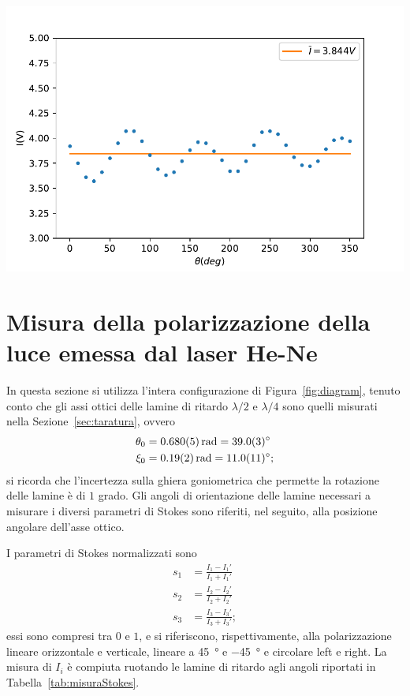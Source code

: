 \documentclass[10pt,oneside,a4paper]{article}
\newenvironment{Figure}
  {\par\medskip\noindent\minipage{\linewidth}}
  {\endminipage\par\medskip}
\begin{document}
\begin{multicols}{2}
\begin{Figure}
	\begin{center}
	\includegraphics[width=\linewidth]{align.pdf}
	\label{fig:align}
	\end{center}
\end{Figure}


\section{Misura della polarizzazione della luce emessa dal laser He-Ne}
In questa sezione si utilizza l'intera configurazione di Figura~\ref{fig:diagram}, tenuto conto che gli assi ottici delle lamine di ritardo $\lambda / 2$ e $\lambda / 4$ sono quelli misurati nella Sezione~\ref{sec:taratura}, ovvero
\[
\begin{aligned}
\theta_0 &= \SI{0.680\pm0.005}{rad} = \SI{39.0 \pm 0.3}{\degree} \\
\xi_0 &= \SI{0.19\pm0.02}{rad} = \SI{11.0 \pm 1.1}{\degree};
\end{aligned}
\]
si ricorda che l'incertezza sulla ghiera goniometrica che permette la rotazione delle lamine è di $1$ grado. Gli angoli di orientazione delle lamine necessari a misurare i diversi parametri di Stokes sono riferiti, nel seguito, alla posizione angolare dell'asse ottico.

I parametri di Stokes normalizzati sono
\[
\begin{aligned}
s_1 &= \frac{I_1 - I_1'}{I_1 + I_1'} \\
s_2 &= \frac{I_2 - I_2'}{I_2 + I_2'} \\
s_3 &= \frac{I_3 - I_3'}{I_3 + I_3'};
\end{aligned}
\]
essi sono compresi tra $0$ e $1$, e si riferiscono, rispettivamente, alla polarizzazione lineare orizzontale e verticale, lineare a \SI{45}{\degree} e \SI{-45}{\degree} e circolare left e right. La misura di $I_i$ è compiuta ruotando le lamine di ritardo agli angoli riportati in Tabella~\ref{tab:misuraStokes}.


\end{multicols}
\end{document}
